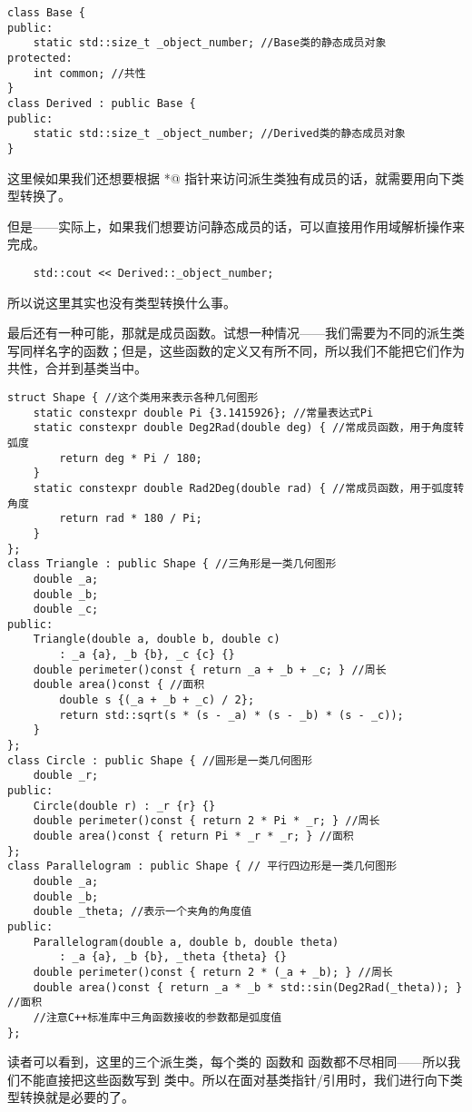 \begin{lstlisting}
class Base {
public:
    static std::size_t _object_number; //Base类的静态成员对象
protected:
    int common; //共性
}
class Derived : public Base {
public:
    static std::size_t _object_number; //Derived类的静态成员对象
}
\end{lstlisting}
这里候如果我们还想要根据 \lstinline@Base*@ 指针来访问派生类独有成员的话，就需要用向下类型转换了。\par
但是——实际上，如果我们想要访问静态成员的话，可以直接用作用域解析操作来完成。
\begin{lstlisting}
    std::cout << Derived::_object_number;
\end{lstlisting}
所以说这里其实也没有类型转换什么事。\par
最后还有一种可能，那就是成员函数。试想一种情况——我们需要为不同的派生类写同样名字的函数；但是，这些函数的定义又有所不同，所以我们不能把它们作为共性，合并到基类当中。
\begin{lstlisting}
struct Shape { //这个类用来表示各种几何图形
    static constexpr double Pi {3.1415926}; //常量表达式Pi
    static constexpr double Deg2Rad(double deg) { //常成员函数，用于角度转弧度
        return deg * Pi / 180;
    }
    static constexpr double Rad2Deg(double rad) { //常成员函数，用于弧度转角度
        return rad * 180 / Pi;
    }
};
class Triangle : public Shape { //三角形是一类几何图形
    double _a;
    double _b;
    double _c;
public:
    Triangle(double a, double b, double c)
        : _a {a}, _b {b}, _c {c} {}
    double perimeter()const { return _a + _b + _c; } //周长
    double area()const { //面积
        double s {(_a + _b + _c) / 2};
        return std::sqrt(s * (s - _a) * (s - _b) * (s - _c));
    }
};
class Circle : public Shape { //圆形是一类几何图形
    double _r;
public:
    Circle(double r) : _r {r} {}
    double perimeter()const { return 2 * Pi * _r; } //周长
    double area()const { return Pi * _r * _r; } //面积
};
class Parallelogram : public Shape { // 平行四边形是一类几何图形
    double _a;
    double _b;
    double _theta; //表示一个夹角的角度值
public:
    Parallelogram(double a, double b, double theta)
        : _a {a}, _b {b}, _theta {theta} {}
    double perimeter()const { return 2 * (_a + _b); } //周长
    double area()const { return _a * _b * std::sin(Deg2Rad(_theta)); } //面积
    //注意C++标准库中三角函数接收的参数都是弧度值
};
\end{lstlisting}
读者可以看到，这里的三个派生类，每个类的 \lstinline@perimeter@ 函数和 \lstinline@area@ 函数都不尽相同——所以我们不能直接把这些函数写到 \lstinline@Shape@ 类中。所以在面对基类指针/引用时，我们进行向下类型转换就是必要的了。\par
